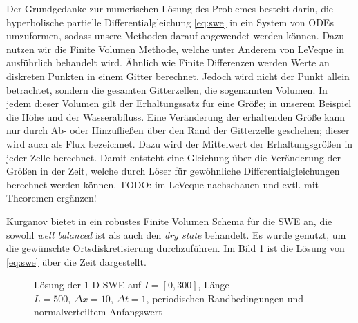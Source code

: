 Der Grundgedanke zur numerischen Lösung des Problemes besteht darin, die hyperbolische partielle Differentialgleichung \eqref{eq:swe} in ein System von ODEs umzuformen, sodass unsere Methoden darauf angewendet werden können.
Dazu nutzen wir die Finite Volumen Methode, welche unter Anderem von LeVeque in \cite[Abschnitt 4.]{leveque2002finite} ausführlich behandelt wird. Ähnlich wie Finite Differenzen werden Werte an diskreten Punkten in einem Gitter berechnet. Jedoch wird nicht der Punkt allein betrachtet, sondern die gesamten Gitterzellen, die sogenannten Volumen. In jedem dieser Volumen gilt der Erhaltungssatz für eine Größe; in unserem Beispiel die Höhe und der Wasserabfluss. Eine Veränderung der erhaltenden Größe kann nur durch Ab- oder Hinzufließen über den Rand der Gitterzelle geschehen; dieser wird auch als Flux bezeichnet. Dazu wird der Mittelwert der Erhaltungsgrößen in jeder Zelle berechnet. Damit entsteht eine Gleichung über die Veränderung der Größen in der Zeit, welche durch Löser für gewöhnliche Differentialgleichungen berechnet werden können.
TODO: im LeVeque nachschauen und evtl. mit Theoremen ergänzen!

Kurganov bietet in \cite{kurganov2007second} ein robustes Finite Volumen Schema für die SWE an, die sowohl \textit{well balanced} ist als auch den \textit{dry state} behandelt. Es wurde genutzt, um die gewünschte Ortsdiskretisierung durchzuführen. Im Bild \ref{fig:sweSolution} ist die Lösung von \eqref{eq:swe} über die Zeit dargestellt.

\begin{figure}
 \centering
 
 \caption{Lösung der 1-D SWE auf $I=[0,300]$, Länge $L=500,~\Delta x=10,~\Delta t=1$, periodischen Randbedingungen und normalverteiltem Anfangswert}
 \label{fig:sweSolution}
\end{figure}

